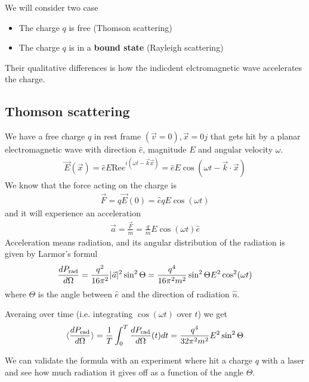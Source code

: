 We will consider two case
\begin{itemize}
  \item The charge $q$ is free (Thomson scattering)
  \item The charge $q$ is in a \textbf{bound state} (Rayleigh scattering)
\end{itemize}
Their qualitative differences is how the indicdent elctromagnetic wave accelerates the charge.

\subsection{Thomson scattering}
We have a free charge $q$ in rest frame $(\vec{v} = 0),\vec{x}= 0j$ that gets hit by a planar electromagnetic wave with direction $\hat{e}$, magnitude $E$ and angular velocity $\omega$.
\begin{align*}
  \vec{E}(\vec{x}) = \hat{e} E \text{Re} e^{i(\omega t - \vec{k}\vec{x})}
  = \hat{e} E \cos(\omega t - \vec{k} \cdot \vec{x})
\end{align*}
We know that the force acting on the charge is
\begin{align*}
  \vec{F} = q \vec{E}(0) = \hat{e} qE \cos(\omega t)
\end{align*}
and it will experience an acceleration
\begin{align*}
  \vec{a} = \frac{\vec{F}}{m} = \frac{q}{m}E \cos(\omega t) \hat{e}
\end{align*}
Acceleration means radiation, and its angular distribution of the radiation is given by Larmor's formul
\begin{align*}
  \frac{d P_{\text{rad}}}{d \Omega} = \frac{q^{2}}{16 \pi^{2}} \vert\vec{a}\vert^{2} \sin^{2} \Theta = \frac{q^{4}}{16 \pi^{2} m^{2}} \sin^{2} \Theta E^{2} \cos^{2}(\omega t)
\end{align*}
where $\Theta$ is the angle between $\hat{e}$ and the direction of radiation $\hat{n}$.

Averaing over time (i.e. integrating $\cos(\omega t)$ over $t$) we get 
\begin{align*}
  \langle\frac{d P_{\text{rad}}}{d \Omega}\rangle = \frac{1}{T} \int_0^{T} \frac{d P_{\text{rad}}}{d \Omega}(t) dt = \frac{q^{4}}{32 \pi^{2}m^{2}}E^{2} \sin^{2}\Theta
\end{align*}

We can validate the formula with an experiment where hit a charge $q$ with a laser and see how much radiation it gives off as a function of the angle $\Theta$.

